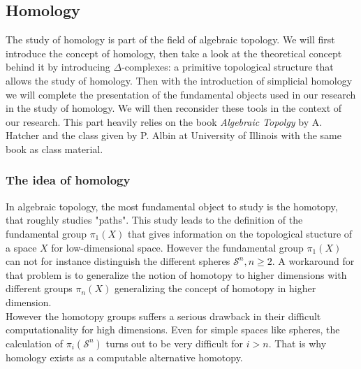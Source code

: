 \documentclass[12pt, a4paper]{article}
\begin{document}
\subsection{Homology}
\label{sec:homology}

The study of homology is part of the field of algebraic topology. We will first introduce the concept of homology, then take a look at the theoretical concept behind it by introducing $\Delta$-complexes: a primitive topological structure that allows the study of homology. Then with the introduction of simplicial homology we will complete the presentation of the fundamental objects used in our research in the study of homology. We will then reconsider these tools in the context of our research. This part heavily relies on the book \textit{Algebraic Topolgy} by A. Hatcher \cite{hatcher_algebraic_2002} and the class given by P. Albin at University of Illinois \cite{albin_1_2018} with the same book as class material. 

\subsubsection{The idea of homology}

In algebraic topology, the most fundamental object to study is the homotopy, that roughly studies "paths". This study leads to the definition of the fundamental group $\pi_1(X)$ that gives information on the topological stucture of a space $X$ for low-dimensional space. However the fundamental group $\pi_1(X)$ can not for instance distinguish the different spheres $\mathcal{S}^n, n\ge 2$. A workaround for that problem is to generalize the notion of homotopy to higher dimensions with different groups $\pi_n(X)$ generalizing the concept of homotopy in higher dimension. \\

However the homotopy groups suffers a serious drawback in their difficult computationality for high dimensions. Even for simple spaces like spheres, the calculation of $\pi_i(\mathcal{S}^n)$ turns out to be very difficult for $i > n$. That is why homology exists as a computable alternative homotopy.\\
\end{document}
